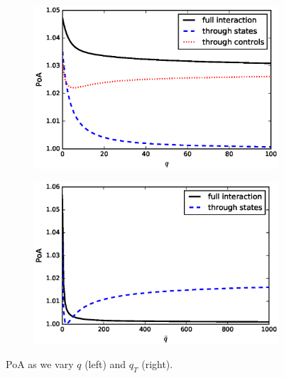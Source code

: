 \documentclass[11pt]{article}
\begin{document}
\begin{figure}[!htb]
    \centering
    \begin{subfigure}{.45\textwidth}
        \includegraphics[scale=0.5]{PoA_half_more_steps_q.eps}
    \end{subfigure}
    \begin{subfigure}{.45\textwidth}
        \includegraphics[scale=0.5]{PoA_half_more_steps_qbar.eps}
    \end{subfigure}
    \caption{PoA as we vary $q$ (left) and $q_T$ (right).}
    \label{fig:q_q_T}
\end{figure}
\end{document}
